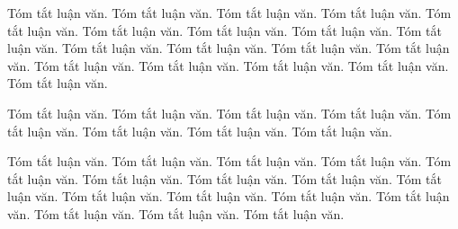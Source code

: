  
\begin{abstracts}         
Tóm tắt luận văn. Tóm tắt luận văn. Tóm tắt luận văn. Tóm tắt luận văn. Tóm tắt luận văn. Tóm tắt luận văn. Tóm tắt luận văn. Tóm tắt luận văn. Tóm tắt luận văn. Tóm tắt luận văn. Tóm tắt luận văn. Tóm tắt luận văn. Tóm tắt luận văn. Tóm tắt luận văn. Tóm tắt luận văn. Tóm tắt luận văn. Tóm tắt luận văn. Tóm tắt luận văn. 

Tóm tắt luận văn. Tóm tắt luận văn. Tóm tắt luận văn. Tóm tắt luận văn. Tóm tắt luận văn. Tóm tắt luận văn. Tóm tắt luận văn. Tóm tắt luận văn. 

Tóm tắt luận văn. Tóm tắt luận văn. Tóm tắt luận văn. Tóm tắt luận văn. Tóm tắt luận văn. Tóm tắt luận văn. Tóm tắt luận văn. Tóm tắt luận văn. Tóm tắt luận văn. Tóm tắt luận văn. Tóm tắt luận văn. Tóm tắt luận văn. Tóm tắt luận văn. Tóm tắt luận văn. Tóm tắt luận văn. Tóm tắt luận văn. 



\end{abstracts}
 
